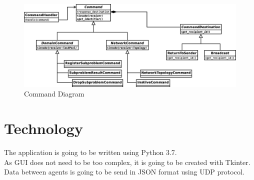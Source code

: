 \documentclass{article}
\begin{document}
\begin{figure}[H]
	\centering
	\includegraphics[width=\linewidth]{diagrams/CommandDiagram.eps}
	\caption{Command Diagram}
\end{figure}

\section{Technology}
The application is going to be written using Python 3.7. \\
As GUI does not need to be too complex, it is going to be created with Tkinter. \\
Data between agents is going to be send in JSON format using UDP protocol. \\
\end{document}
